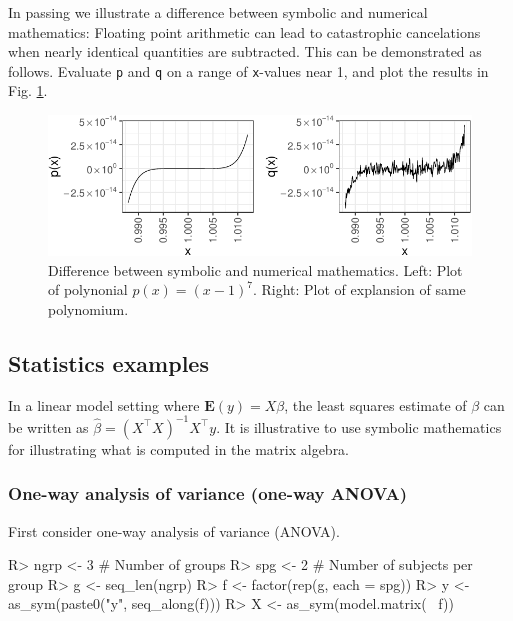 In passing we illustrate a difference between symbolic and numerical
mathematics: Floating point arithmetic can lead to catastrophic
cancelations when nearly identical quantities are subtracted. This can
be demonstrated as follows. Evaluate \texttt{p} and \texttt{q} on a
range of \texttt{x}-values near 1, and plot the results in Fig.
\ref{fig:pols-pq}.

\begin{Schunk}
\begin{figure}
\includegraphics{pols-pq-1} \caption[Difference between symbolic and numerical mathematics]{Difference between symbolic and numerical mathematics. Left: Plot of polynonial $p(x) = (x-1)^7$. Right: Plot of explansion of same polynomium.}\label{fig:pols-pq}
\end{figure}
\end{Schunk}

\hypertarget{statistics-examples}{%
\subsection{Statistics examples}\label{statistics-examples}}

In a linear model setting where \(\mathbf{E}(y)=X\beta\), the least
squares estimate of \(\beta\) can be written as
\(\hat\beta = (X^\top X)^{-1} X^\top y\). It is illustrative to use
symbolic mathematics for illustrating what is computed in the matrix
algebra.

\hypertarget{one-way-analysis-of-variance-one-way-anova}{%
\subsubsection{One-way analysis of variance (one-way
ANOVA)}\label{one-way-analysis-of-variance-one-way-anova}}

First consider one-way analysis of variance (ANOVA).

\begin{Schunk}
\begin{Sinput}
R> ngrp <- 3 # Number of groups
R> spg  <- 2 # Number of subjects per group
R> g <- seq_len(ngrp)
R> f <- factor(rep(g, each = spg))
R> y <- as_sym(paste0("y", seq_along(f)))
R> X <- as_sym(model.matrix(~ f))
\end{Sinput}
\end{Schunk}

